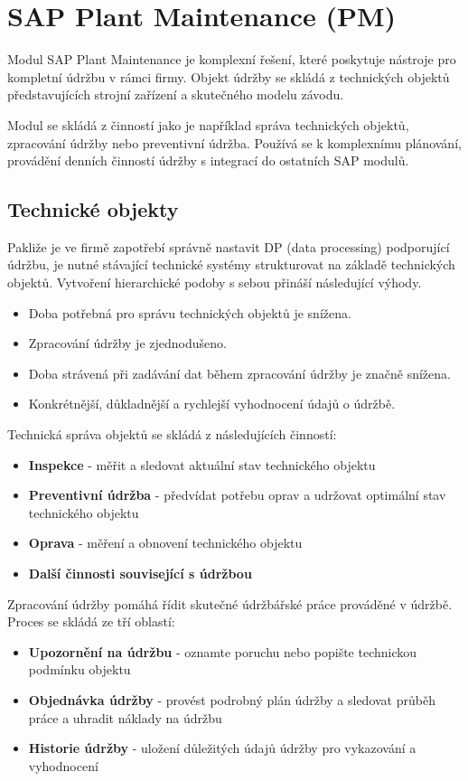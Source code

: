 \documentclass[thesis=M,czech]{FITthesis}[2012/06/26]
\begin{document}
\section{SAP Plant Maintenance (PM)}
Modul SAP Plant Maintenance je komplexní řešení, které poskytuje nástroje pro kompletní údržbu v rámci firmy. Objekt údržby se skládá z technických objektů představujících strojní zařízení a skutečného modelu závodu.

Modul se skládá z činností jako je například správa technických objektů, zpracování údržby nebo preventivní údržba. Používá se k komplexnímu plánování, provádění denních činností údržby s integrací do ostatních SAP modulů.

\subsection{Technické objekty}
Pakliže je ve firmě zapotřebí správně nastavit DP (data processing) podporující údržbu, je nutné stávající technické systémy strukturovat na základě technických objektů. Vytvoření hierarchické podoby s sebou přináší následující výhody.
\begin{itemize}
	\item
	Doba potřebná pro správu technických objektů je snížena.
	\item
	Zpracování údržby je zjednodušeno.
	\item
	Doba strávená při zadávání dat během zpracování údržby je značně snížena.
	\item
	Konkrétnější, důkladnější a rychlejší vyhodnocení údajů o údržbě.
\end{itemize}

Technická správa objektů se skládá z následujících činností:
\begin{itemize}
	\item
	\textbf{Inspekce} - měřit a sledovat aktuální stav technického objektu
	\item
	\textbf{Preventivní údržba} - předvídat potřebu oprav a udržovat optimální stav technického objektu
	\item
	\textbf{Oprava} - měření a obnovení technického objektu
	\item
	\textbf{Další činnosti související s údržbou}
\end{itemize}
\vspace*{0.5cm}
Zpracování údržby pomáhá řídit skutečné údržbářské práce prováděné v údržbě. Proces se skládá ze tří oblastí:
\begin{itemize}
	\item
	\textbf{Upozornění na údržbu} -  oznamte poruchu nebo popište technickou podmínku objektu
	\item
	\textbf{Objednávka údržby} - provést podrobný plán údržby a sledovat průběh práce a uhradit náklady na údržbu
	\item
	\textbf{Historie údržby} - uložení důležitých údajů údržby pro vykazování a vyhodnocení
\end{itemize} 	
\end{document}

